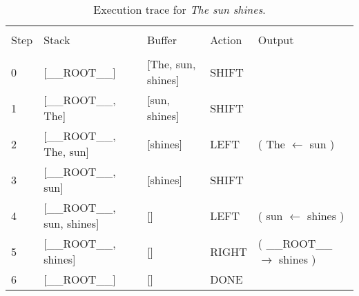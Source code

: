 \documentclass[
12pt,
a4paper,
oneside,
headinclude,
footinclude]{article}
\begin{document}
    
    \begin{center}
    \begin{table}[H]   
        \hspace*{-2.0cm}
        \begin{tabular}{l p{5cm} p{5cm} l l} %
            \hline
            \hline 
            \\[-1.5ex]
            \textcolor{BrickRed}{Step} & \textcolor{BrickRed}{Stack} & \textcolor{BrickRed}{Buffer} & \textcolor{BrickRed}{Action} & \textcolor{BrickRed}{Output}\\ [0.5ex]
            \hline %
            \\[-1.5ex]
            0 & [\_\_ROOT\_\_] & [The, sun, shines] & SHIFT & \\ 
            1 & [\_\_ROOT\_\_, The] & [sun, shines] & SHIFT & \\ 
            2 & [\_\_ROOT\_\_, The, sun] & [shines] & LEFT & ( The $\leftarrow$ sun )\\ 
            3 & [\_\_ROOT\_\_, sun] & [shines] & SHIFT & \\ 
            4 & [\_\_ROOT\_\_, sun, shines] & [] & LEFT & ( sun $\leftarrow$ shines )\\ 
            5 & [\_\_ROOT\_\_, shines] & [] & RIGHT & ( \_\_ROOT\_\_ $\rightarrow$ shines )\\ 
            6 & [\_\_ROOT\_\_] & [] & DONE &     
            \\[1ex] %
            \hline %
        \end{tabular}
        \caption{\label{tab:trace-2}Execution trace for \textit{The sun shines}.}
    \end{table} 
    \end{center}
    
    
    
    
\end{document}
